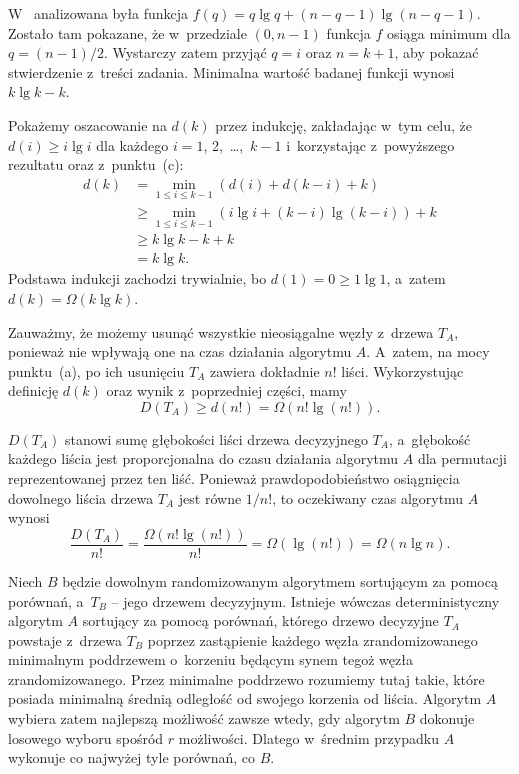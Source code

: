 \subproblem %
W~ analizowana była funkcja $f(q)=q\lg q+(n-q-1)\lg(n-q-1)$. Zostało tam pokazane, że w~przedziale $(0,n-1)$ funkcja $f$ osiąga minimum dla $q=(n-1)/2$. Wystarczy zatem przyjąć $q=i$ oraz $n=k+1$, aby pokazać stwierdzenie z~treści zadania. Minimalna wartość badanej funkcji wynosi $k\lg k-k$.

Pokażemy oszacowanie na $d(k)$ przez indukcję, zakładając w~tym celu, że $d(i)\ge i\lg i$ dla każdego $i=1$, 2,~\dots,~$k-1$ i~korzystając z~powyższego rezultatu oraz z~punktu~(c):
\begin{align*}
	d(k) &= \min_{1\le i\le k-1}(d(i)+d(k-i)+k) \\
	&\ge \min_{1\le i\le k-1}(i\lg i+(k-i)\lg(k-i))+k \\
	&\ge k\lg k-k+k \\
	&= k\lg k.
\end{align*}
Podstawa indukcji zachodzi trywialnie, bo $d(1)=0\ge 1\lg1$, a~zatem $d(k)=\Omega(k\lg k)$.

\subproblem %
Zauważmy, że możemy usunąć wszystkie nieosiągalne węzły z~drzewa $T_A$, ponieważ nie wpływają one na czas działania algorytmu $A$. A~zatem, na mocy punktu~(a), po ich usunięciu $T_A$ zawiera dokładnie $n!$ liści. Wykorzystując definicję $d(k)$ oraz wynik z~poprzedniej części, mamy
\[
	D(T_A) \ge d(n!) = \Omega(n!\lg(n!)).
\]

$D(T_A)$ stanowi sumę głębokości liści drzewa decyzyjnego $T_A$, a~głębokość każdego liścia jest proporcjonalna do czasu działania algorytmu $A$ dla permutacji reprezentowanej przez ten liść. Ponieważ prawdopodobieństwo osiągnięcia dowolnego liścia drzewa $T_A$ jest równe $1/n!$, to oczekiwany czas algorytmu $A$ wynosi
\[
	\frac{D(T_A)}{n!} = \frac{\Omega(n!\lg(n!))}{n!} = \Omega(\lg(n!)) = \Omega(n\lg n).
\]

\subproblem %
Niech $B$ będzie dowolnym randomizowanym algorytmem sortującym za pomocą porównań, a~$T_B$ -- jego drzewem decyzyjnym. Istnieje wówczas deterministyczny algorytm $A$ sortujący za pomocą porównań, którego drzewo decyzyjne $T_A$ powstaje z~drzewa $T_B$ poprzez zastąpienie każdego węzła zrandomizowanego minimalnym poddrzewem o~korzeniu będącym synem tegoż węzła zrandomizowanego. Przez minimalne poddrzewo rozumiemy tutaj takie, które posiada minimalną średnią odległość od swojego korzenia od liścia. Algorytm $A$ wybiera zatem najlepszą możliwość zawsze wtedy, gdy algorytm $B$ dokonuje losowego wyboru spośród $r$ możliwości. Dlatego w~średnim przypadku $A$ wykonuje co najwyżej tyle porównań, co $B$.

